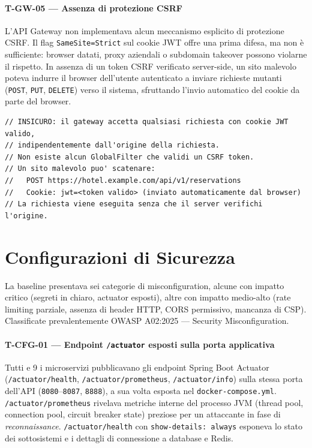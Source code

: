 ﻿\documentclass[a4paper,12pt]{report}
\begin{document}
\paragraph{T-GW-05 — Assenza di protezione CSRF}
L'API Gateway non implementava alcun meccanismo esplicito di protezione CSRF.
Il flag \texttt{SameSite=Strict} sul cookie JWT offre una prima difesa, ma non è
sufficiente: browser datati, proxy aziendali o subdomain takeover possono violarne
il rispetto. In assenza di un token CSRF verificato server-side, un sito malevolo
poteva indurre il browser dell'utente autenticato a inviare richieste mutanti
(\texttt{POST}, \texttt{PUT}, \texttt{DELETE}) verso il sistema, sfruttando
l'invio automatico del cookie da parte del browser.

\begin{insecurebox}[title={api-gateway (baseline) --- nessun filtro CSRF}]
\begin{lstlisting}[style=java]
// INSICURO: il gateway accetta qualsiasi richiesta con cookie JWT valido,
// indipendentemente dall'origine della richiesta.
// Non esiste alcun GlobalFilter che validi un CSRF token.
// Un sito malevolo puo' scatenare:
//   POST https://hotel.example.com/api/v1/reservations
//   Cookie: jwt=<token valido> (inviato automaticamente dal browser)
// La richiesta viene eseguita senza che il server verifichi l'origine.
\end{lstlisting}
\end{insecurebox}

\section{Configurazioni di Sicurezza}

La baseline presentava sei categorie di misconfiguration, alcune con impatto critico
(segreti in chiaro, actuator esposti), altre con impatto medio-alto (rate limiting
parziale, assenza di header HTTP, CORS permissivo, mancanza di CSP).
Classificate prevalentemente OWASP A02:2025 --- Security Misconfiguration.

\paragraph{T-CFG-01 — Endpoint \texttt{/actuator} esposti sulla porta applicativa}
Tutti e 9 i microservizi pubblicavano gli endpoint Spring Boot Actuator
(\texttt{/actuator/health}, \texttt{/actuator/prometheus}, \texttt{/actuator/info})
sulla stessa porta dell'API (\texttt{8080}--\texttt{8087}, \texttt{8888}),
a sua volta esposta nel \texttt{docker-compose.yml}.
\texttt{/actuator/prometheus} rivelava metriche interne del processo JVM (thread pool,
connection pool, circuit breaker state) preziose per un attaccante in fase di
\emph{reconnaissance}. \texttt{/actuator/health} con \texttt{show-details: always}
esponeva lo stato dei sottosistemi e i dettagli di connessione a database e Redis.
\end{document}
